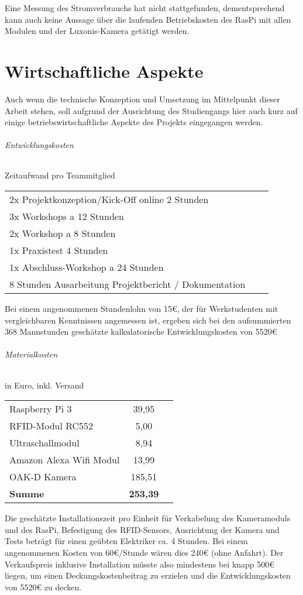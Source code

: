 Eine Messung des Stromverbrauchs hat nicht stattgefunden, dementsprechend kann auch keine Aussage über die laufenden Betriebskosten des RasPi mit allen Modulen und der Luxonis-Kamera getätigt werden.

\chapter{Wirtschaftliche Aspekte}
Auch wenn die technische Konzeption und Umsetzung im Mittelpunkt dieser Arbeit stehen, soll aufgrund der Ausrichtung des Studiengangs hier auch kurz auf einige betriebswirtschaftliche Aspekte des Projekts eingegangen werden.\subparagraph*{Entwicklungskosten}
   \newline
Zeitaufwand pro Teammitglied

\begin{tabular}[h]{lcr}
2x Projektkonzeption/Kick-Off online 2 Stunden \\
3x Workshops a 12 Stunden\\
2x Workshop a 8 Stunden\\
1x Praxistest 4 Stunden\\
1x Abschluss-Workshop a 24 Stunden \\
8 Stunden Ausarbeitung Projektbericht / Dokumentation\\
\end{tabular} \newline

Bei einem angenommenen Stundenlohn von 15€, der für Werkstudenten mit vergleichbaren Kenntnissen angemessen ist, ergeben sich bei den aufsummierten 368 Mannstunden geschätzte kalkulatorische Entwicklungskosten von 5520€
\subparagraph*{Materialkosten} in Euro, inkl. Versand  \newline 

\begin{tabular}[h]{lcr}
Raspberry Pi 3	&   39,95 \autocite{Pi3b} \newline \\
RFID-Modul RC552 &		5,00\autocite{RFID} \newline\\
Ultraschallmodul	&  8,94\autocite{SR04} \newline \\
Amazon Alexa Wifi Modul & 13,99\autocite{eWe}	\\
OAK-D Kamera & 185,51 \autocite{eWe} \\
\textbf{Summe}			&	\textbf{253,39}
\end{tabular} \newline


Die geschätzte Installationszeit pro Einheit für Verkabelung des Kameramoduls und des RasPi, Befestigung des RFID-Sensors, Ausrichtung der Kamera und Tests beträgt für einen geübten Elektriker ca. 4 Stunden.
Bei einem angenommenen Kosten von 60€/Stunde wären dies 240€ (ohne Anfahrt). Der Verkaufspreis inklusive Installation müsste also mindestens bei knapp 500€ liegen, um einen Deckungskostenbeitrag zu erzielen und die Entwicklungskosten von 5520€ zu decken.




